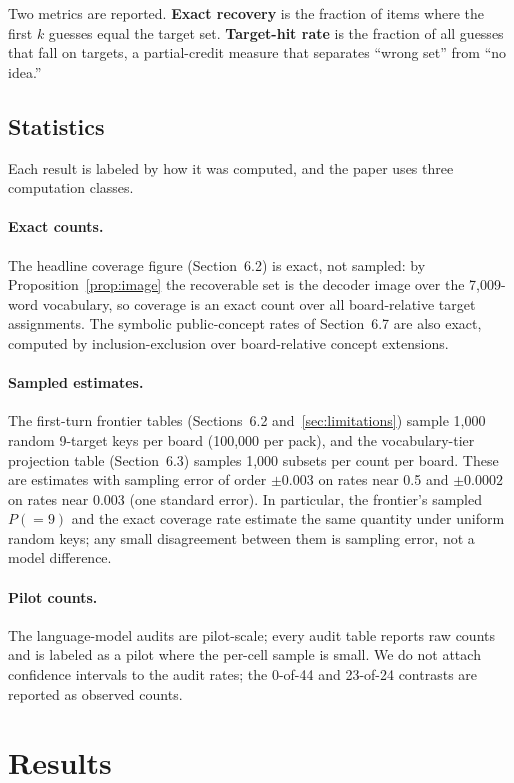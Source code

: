 \documentclass[11pt]{article}
\begin{document}
Two metrics are reported. \textbf{Exact recovery} is the fraction of items where
the first $k$ guesses equal the target set. \textbf{Target-hit rate} is the
fraction of all guesses that fall on targets, a partial-credit measure that
separates ``wrong set'' from ``no idea.''

\subsection{Statistics}

Each result is labeled by how it was computed, and the paper uses three
computation classes.

\paragraph{Exact counts.}
The headline coverage figure (Section~6.2) is exact, not sampled: by
Proposition~\ref{prop:image} the recoverable set is the decoder image over the
7,009-word vocabulary, so coverage is an exact count over all board-relative
target assignments. The symbolic public-concept rates of Section~6.7 are also
exact, computed by inclusion-exclusion over board-relative concept extensions.

\paragraph{Sampled estimates.}
The first-turn frontier tables (Sections~6.2 and~\ref{sec:limitations}) sample
1,000 random 9-target keys per board (100,000 per pack), and the vocabulary-tier
projection table (Section~6.3) samples 1,000 subsets per count per board. These
are estimates with sampling error of order $\pm 0.003$ on rates near 0.5 and
$\pm 0.0002$ on rates near 0.003 (one standard error). In particular, the
frontier's sampled $P(=9)$ and the exact coverage rate estimate the same quantity
under uniform random keys; any small disagreement between them is sampling error,
not a model difference.

\paragraph{Pilot counts.}
The language-model audits are pilot-scale; every audit table reports raw counts
and is labeled as a pilot where the per-cell sample is small. We do not attach
confidence intervals to the audit rates; the 0-of-44 and 23-of-24 contrasts are
reported as observed counts.

\section{Results}\label{sec:results}
\end{document}
